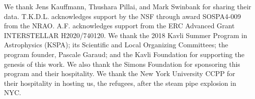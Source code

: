 \documentclass[apj]{emulateapj} %
\begin{document}
\acknowledgements


We thank Jens Kauffmann, Thushara Pillai, and Mark Swinbank for sharing their data.
T.K.D.L. acknowledges support by the NSF through award SOSPA4-009
from the NRAO.
A.F. acknowledges support from the ERC Advanced Grant INTERSTELLAR H2020/740120.
We thank the 2018 Kavli Summer Program in Astrophysics (KSPA); 
its Scientific and Local Organizing Committees; the program founder, Pascale Garaud; 
and the Kavli Foundation for supporting the genesis of this work. 
We also thank the Simons Foundation for sponsoring this program and their hospitality.
We thank the New York University CCPP for their hospitality in hosting us, the refugees, after the steam pipe explosion in NYC.



\end{document}
